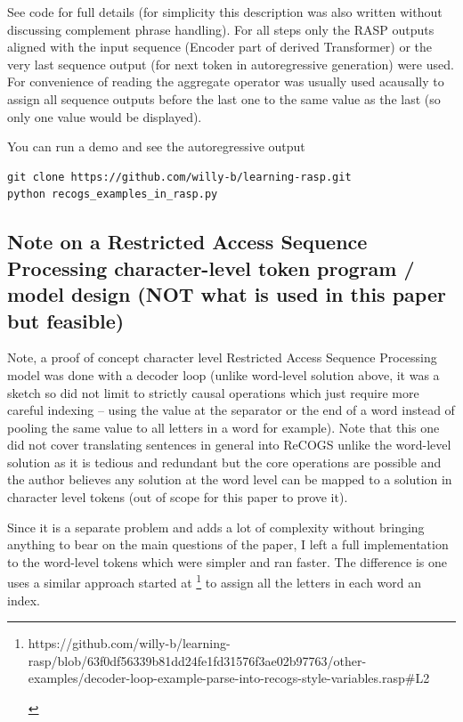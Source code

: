 \documentclass[11pt]{article}
\begin{document}
See code for full details (for simplicity this description was also written without discussing complement phrase handling). For all steps only the RASP outputs aligned with the input sequence (Encoder part of derived Transformer) or the very last sequence output (for next token in autoregressive generation) were used. For convenience of reading the aggregate operator was usually used acausally to assign all sequence outputs before the last one to the same value as the last (so only one value would be displayed).

You can run a demo and see the autoregressive output 

\begin{tiny}
\begin{verbatim}
git clone https://github.com/willy-b/learning-rasp.git
python recogs_examples_in_rasp.py
\end{verbatim}
\end{tiny}

\clearpage

\subsection{Note on a Restricted Access Sequence Processing character-level token program / model design (NOT what is used in this paper but feasible)}
\label{rasp_character_level_model_notes}

Note, a proof of concept character level Restricted Access Sequence Processing model was done with a decoder loop (unlike word-level solution above, it was a sketch so did not limit to strictly causal operations which just require more careful indexing -- using the value at the separator or the end of a word instead of pooling the same value to all letters in a word for example). Note that this one did not cover translating sentences in general into ReCOGS unlike the word-level solution as it is tedious and redundant but the core operations are possible and the author believes any solution at the word level can be mapped to a solution in character level tokens (out of scope for this paper to prove it).

Since it is a separate problem and adds a lot of complexity without bringing anything to bear on the main questions of the paper, I left a full implementation to the word-level tokens which were simpler and ran faster. The difference is one uses a similar approach started at \footnote{\begin{footnotesize} https://github.com/willy-b/learning-rasp/blob/63f0df56339b81dd24fe1fd31576f3ae02b97763/other-examples/decoder-loop-example-parse-into-recogs-style-variables.rasp\#L2 \end{footnotesize}} to assign all the letters in each word an index. 
\end{document}
